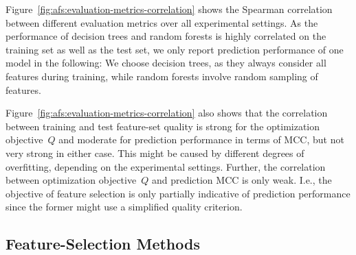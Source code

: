 \documentclass{article}
\theoremstyle{definition}
\begin{document}
Figure~\ref{fig:afs:evaluation-metrics-correlation} shows the Spearman correlation between different evaluation metrics over all experimental settings.
As the performance of decision trees and random forests is highly correlated on the training set as well as the test set, we only report prediction performance of one model in the following:
We choose decision trees, as they always consider all features during training, while random forests involve random sampling of features.

Figure~\ref{fig:afs:evaluation-metrics-correlation} also shows that the correlation between training and test feature-set quality is strong for the optimization objective~$Q$ and moderate for prediction performance in terms of MCC, but not very strong in either case.
This might be caused by different degrees of overfitting, depending on the experimental settings.
Further, the correlation between optimization objective~$Q$ and prediction MCC is only weak.
I.e., the objective of feature selection is only partially indicative of prediction performance since the former might use a simplified quality criterion.

\subsection{Feature-Selection Methods}
\label{sec:afs:evaluation:feature-selection}
\end{document}
